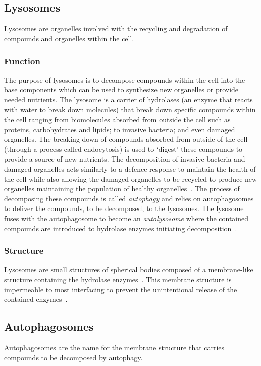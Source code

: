 \subsection{Lysosomes}\label{subsec:lysosome}
Lysosomes are organelles involved with the recycling and degradation of compounds and organelles within the cell.
\subsubsection*{Function}
The purpose of lysosomes is to decompose compounds within the cell into the base components which can be used to synthesize new organelles or provide needed nutrients. The lysosome is a carrier of hydrolases (an enzyme that reacts with water to break down molecules) that break down specific compounds within the cell ranging from biomolecules absorbed from outside the cell such as proteins, carbohydrates and lipids; to invasive bacteria; and even damaged organelles. The breaking down of compounds absorbed from outside of the cell (through a process called endocytosis) is used to `digest' these compounds to provide a source of new nutrients. The decomposition of invasive bacteria and damaged organelles acts similarly to a defence response to maintain the health of the cell while also allowing the damaged organelles to be recycled to produce new organelles maintaining the population of healthy organelles~\cite{lyso_auto_relation, cell_phys_book}. The process of decomposing these compounds is called \textit{autophagy} and relies on autophagosomes to deliver the compounds, to be decomposed, to the lysosomes. The lysosome fuses with the autophagosome to become an \textit{autolysosome} where the contained compounds are introduced to hydrolase enzymes initiating decomposition~\cite{lyso_auto_relation}.
\subsubsection*{Structure}
Lysosomes are small structures of spherical bodies composed of a membrane-like structure containing the hydrolase enzymes~\cite{cell_phys_book}. This membrane structure is impermeable to most interfacing to prevent the unintentional release of the contained enzymes~\cite{lyso_auto_relation}.

\subsection{Autophagosomes}\label{subsec:autophagosome}
Autophagosomes are the name for the membrane structure that carries compounds to be decomposed by autophagy.
